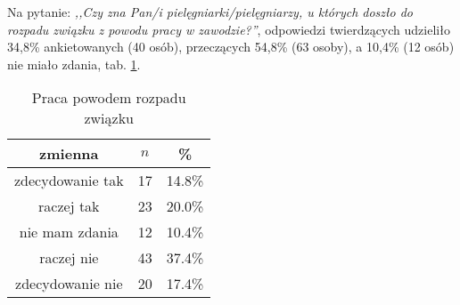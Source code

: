 
Na pytanie: \textit{,,Czy zna Pan/i pielęgniarki/pielęgniarzy, u których doszło do rozpadu związku z powodu pracy w zawodzie?''}, odpowiedzi twierdzących udzieliło 34,8\% ankietowanych (40 osób), przeczących 54,8\% (63 osoby), a 10,4\% (12 osób) nie miało zdania, tab. \ref{tab:Q29}.
\begin{table}[H]
\caption{Praca powodem rozpadu związku}
\centering
\begin{tabular}{ | c | c | c |}
\hline
zmienna & $n$ & \% \\
\hline
zdecydowanie tak  &  17  & 14.8\% \\
\hline
raczej tak  &  23  & 20.0\% \\
\hline
nie mam zdania  &  12  & 10.4\% \\
\hline
raczej nie  &  43  & 37.4\% \\
\hline
zdecydowanie nie  &  20  & 17.4\% \\
\hline
\end{tabular}
\label{tab:Q29}
\end{table}
